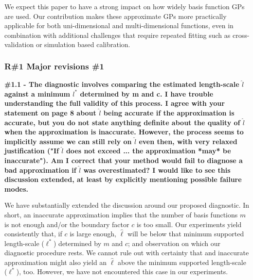 \documentclass[11pt]{report}
\begin{document}
We expect this paper to have a strong impact on how widely basis function GPs are used. Our contribution makes these approximate GPs more practically applicable for both uni-dimensional and multi-dimensional functions, even in combination with additional challenges that require repeated fitting such as cross-validation or simulation based calibration.


\subsubsection*{R\#1 Major revisions \#1}

\textbf{\#1.1 - The diagnostic involves comparing the estimated length-scale $\hat l$ against a minimum $l^*$ determined by m and c. I have trouble understanding the full validity of this process. I agree with your statement on page 8 about $\hat l$ being accurate if the approximation is accurate, but you do not state anything definite about the quality of $\hat l$ when the approximation is inaccurate. However, the process seems to implicitly assume we can still rely on $\hat l$ even then, with very relaxed justification ("If $\hat l$ does not exceed ... the approximation *may* be inaccurate"). Am I correct that your method would fail to diagnose a bad approximation if $\hat l$ was overestimated? I would like to see this discussion extended, at least by explicitly mentioning possible failure modes.}

We have substantially extended the discussion around our proposed diagnostic. In short, an inaccurate approximation implies that the number of basis functions $m$ is not enough and/or the boundary factor $c$ is too small. Our experiments yield consistently that, if $c$ is large enough, $\hat{\ell}$ will be below that minimum supported length-scale ($\ell^*$) determined by $m$ and $c$; and observation on which our diagnostic procedure rests. We cannot rule out with certainty that and inaccurate approximation might also yield an $\hat{\ell}$ above the minimum supported length-scale ($\ell^*$), too. However, we have not encountered this case in our experiments.
\end{document}
